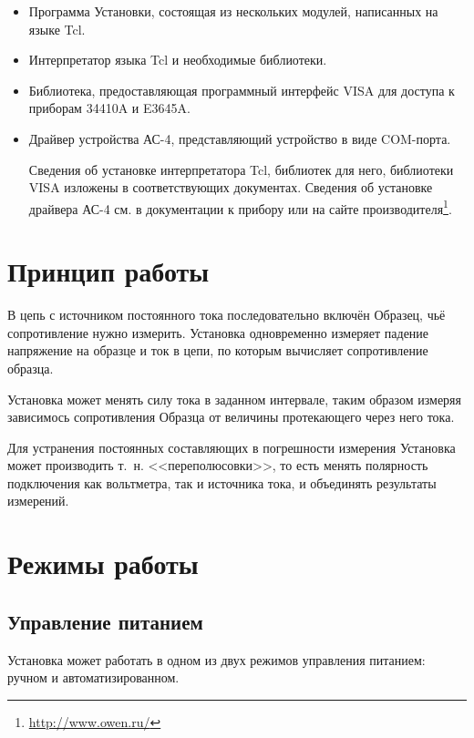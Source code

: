 \documentclass[12pt, a4paper, twocolumn]{report}
\begin{document}
\begin{itemize}

\item Программа Установки, состоящая из нескольких модулей, написанных на языке Tcl.

\item Интерпретатор языка Tcl и необходимые библиотеки.

\item Библиотека, предоставляющая программный интерфейс VISA для доступа к приборам 34410A и E3645A.

\item Драйвер устройства АС-4, представляющий устройство в виде COM-порта.

Сведения об установке интерпретатора Tcl, библиотек для него, библиотеки VISA изложены в соответствующих документах. Сведения об установке драйвера АС-4 см. в документации к прибору или на сайте производителя\footnote{\href{http://www.owen.ru/}{http://www.owen.ru/}}.

\end{itemize}

\section{Принцип работы}

В цепь с источником постоянного тока последовательно включён Образец, чьё сопротивление нужно измерить. Установка одновременно измеряет падение напряжение на образце и ток в цепи, по которым вычисляет сопротивление образца.

Установка может менять силу тока в заданном интервале, таким образом измеряя зависимось сопротивления Образца от величины протекающего через него тока.

Для устранения постоянных составляющих в погрешности измерения Установка может производить т.~н. <<переполюсовки>>, то есть менять полярность подключения как вольтметра, так и источника тока, и объединять результаты измерений. 

\section{Режимы работы}

\subsection{Управление питанием}

Установка может работать в одном из двух режимов управления питанием: ручном и автоматизированном.
\end{document}
